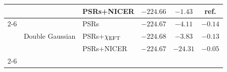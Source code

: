 \begin{tabular}{|l|l|l|c|c|c|}
 &  & PSRs+NICER & \cellcolor{jeffreysred5}$-224.66$ & \cellcolor{jeffreysred3}$-1.43$ & \textbf{ref.} \\
\cline{2-6}
 & \multirow{3}{*}{Double Gaussian} & PSRs & \cellcolor{jeffreysred5}$-224.67$ & \cellcolor{jeffreysred5}$-4.11$ & \cellcolor{jeffreysred1}$-0.14$ \\
 &  & PSRs+$\chi_{\rm{EFT}}$ & \cellcolor{jeffreysred5}$-224.68$ & \cellcolor{jeffreysred5}$-3.83$ & \cellcolor{jeffreysred1}$-0.13$ \\
 &  & PSRs+NICER & \cellcolor{jeffreysred5}$-224.67$ & \cellcolor{jeffreysred5}$-24.31$ & \cellcolor{jeffreysred1}$-0.05$ \\
\cline{2-6}
\hline
\end{tabular}